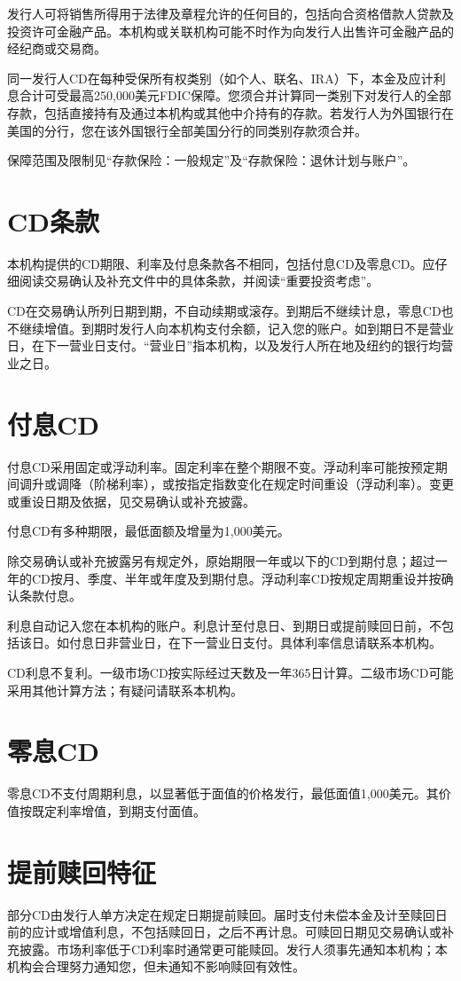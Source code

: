 \documentclass[UTF8,fontset=none,11pt,a4paper]{ctexart}
\begin{document}
发行人可将销售所得用于法律及章程允许的任何目的，包括向合资格借款人贷款及投资许可金融产品。本机构或关联机构可能不时作为向发行人出售许可金融产品的经纪商或交易商。


同一发行人CD在每种受保所有权类别（如个人、联名、IRA）下，本金及应计利息合计可受最高250,000美元FDIC保障。您须合并计算同一类别下对发行人的全部存款，包括直接持有及通过本机构或其他中介持有的存款。若发行人为外国银行在美国的分行，您在该外国银行全部美国分行的同类别存款须合并。


保障范围及限制见“存款保险：一般规定”及“存款保险：退休计划与账户”。


\section*{CD条款}
本机构提供的CD期限、利率及付息条款各不相同，包括付息CD及零息CD。应仔细阅读交易确认及补充文件中的具体条款，并阅读“重要投资考虑”。


CD在交易确认所列日期到期，不自动续期或滚存。到期后不继续计息，零息CD也不继续增值。到期时发行人向本机构支付余额，记入您的账户。如到期日不是营业日，在下一营业日支付。“营业日”指本机构，以及发行人所在地及纽约的银行均营业之日。


\section*{付息CD}
付息CD采用固定或浮动利率。固定利率在整个期限不变。浮动利率可能按预定期间调升或调降（阶梯利率），或按指定指数变化在规定时间重设（浮动利率）。变更或重设日期及依据，见交易确认或补充披露。


付息CD有多种期限，最低面额及增量为1,000美元。


除交易确认或补充披露另有规定外，原始期限一年或以下的CD到期付息；超过一年的CD按月、季度、半年或年度及到期付息。浮动利率CD按规定周期重设并按确认条款付息。


利息自动记入您在本机构的账户。利息计至付息日、到期日或提前赎回日前，不包括该日。如付息日非营业日，在下一营业日支付。具体利率信息请联系本机构。


CD利息不复利。一级市场CD按实际经过天数及一年365日计算。二级市场CD可能采用其他计算方法；有疑问请联系本机构。


\section*{零息CD}
零息CD不支付周期利息，以显著低于面值的价格发行，最低面值1,000美元。其价值按既定利率增值，到期支付面值。


\section*{提前赎回特征}
部分CD由发行人单方决定在规定日期提前赎回。届时支付未偿本金及计至赎回日前的应计或增值利息，不包括赎回日，之后不再计息。可赎回日期见交易确认或补充披露。市场利率低于CD利率时通常更可能赎回。发行人须事先通知本机构；本机构会合理努力通知您，但未通知不影响赎回有效性。
\end{document}
